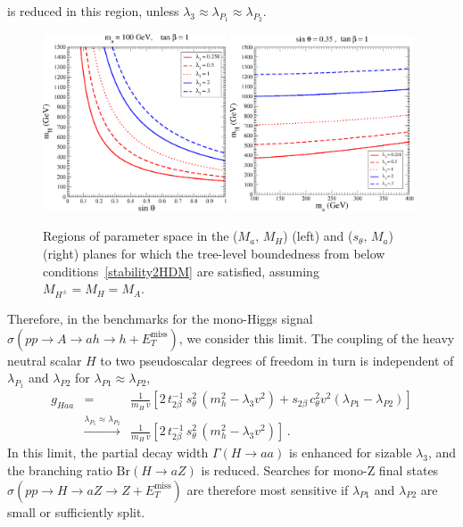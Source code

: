      is reduced in this region, unless $\lambda_3\approx \lambda_{P_1}\approx \lambda_{P_2}$. 
    \begin{figure}[h!]
\begin{center}
\includegraphics[width=0.485\textwidth]{texinputs/03_theoparameters/Figs/Plot_Eq.pdf}
\includegraphics[width=0.485\textwidth]{texinputs/03_theoparameters/Figs/Plot_ma.pdf}
\caption{\small Regions of parameter space in the 
    ($M_a,\, M_{H}$) (left) and ($s_{\theta},\, M_a$) (right) planes for which the tree-level boundedness from below conditions~\eqref{stability2HDM} are satisfied, assuming $M_{H^{\pm}} = M_{H} = M_{A}$. \label{Fig_Stability}}
\end{center}
\vspace{-2mm}
\end{figure}
%
%
Therefore, in the benchmarks for the mono-Higgs signal $\sigma (pp \to A \to ah \to h + E_T^\text{miss})$, we consider this limit. The coupling of the heavy neutral scalar $H$ to two pseudoscalar degrees of freedom in turn is independent of $\lambda_{P_1}$ and $\lambda_{P2}$ for $\lambda_{P1}\approx \lambda_{P2}$,
    \begin{eqnarray}
     g_{Haa} &=& \frac{1}{m_{H} \,v} \left[ 2\, t_{2\beta}^{-1}\, s_{\theta}^2\, 
(m_h^2 - \lambda_3 v^2) + s_{2\beta}\, c_{\theta}^2 v^2 (\lambda_{P1} - \lambda_{P2}) \right] \nonumber \\
&\stackrel{\lambda_{P_1}\approx \lambda_{P_2}}{\longrightarrow} & \frac{1}{m_{H} \,v} \left[ 2\, t_{2\beta}^{-1}\, s_{\theta}^2\, 
(m_h^2 - \lambda_3 v^2) \right] \,. 
    \end{eqnarray}
In this limit, the partial decay width $\Gamma(H \to aa)$ is enhanced for sizable $\lambda_3$, and the branching ratio $\text{Br}(H \to aZ)$ is reduced. Searches for mono-Z final states $\sigma(pp \to H \to aZ \to Z + E_T^\text{miss})$ are therefore most sensitive if $\lambda_{P1}$ and $\lambda_{P2}$ are small or sufficiently split.

 


